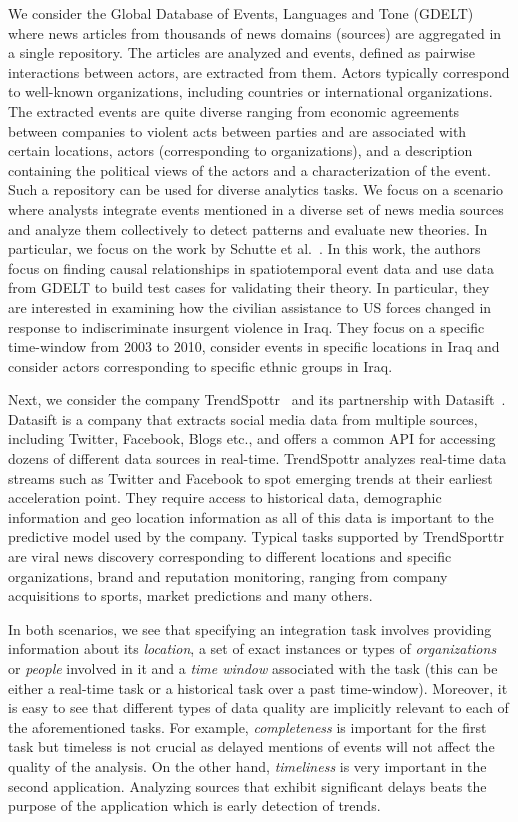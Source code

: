 \documentclass{sig-alternate}
\begin{document}
We consider the Global Database of Events, Languages and Tone (GDELT)~\cite{leetaru:2013} where news articles from thousands of news domains (sources) are aggregated in a single repository. The articles are analyzed and events, defined as pairwise interactions between actors, are extracted from them. Actors typically correspond to well-known organizations, including countries or international organizations. The extracted events are quite diverse ranging from economic agreements between companies to violent acts between parties and are associated with certain locations, actors (corresponding to organizations), and a description containing the political views of the actors and a characterization of the event. Such a repository can be used for diverse analytics tasks. We focus on a scenario where analysts integrate events mentioned in a diverse set of news media sources and analyze them collectively to detect patterns and evaluate new theories. In particular, we focus on the work by Schutte et al.~\cite{schutte:2014}. In this work, the authors focus on finding causal relationships in spatiotemporal event data and use data from GDELT to build test cases for validating their theory. In particular, they are interested in examining how the civilian assistance to US forces changed in response to indiscriminate insurgent violence in Iraq. They focus on a specific time-window from 2003 to 2010, consider events in specific locations in Iraq and consider actors corresponding to specific ethnic groups in Iraq.

Next, we consider the company TrendSpottr~\cite{trendspottr} and its partnership with Datasift~\cite{datasift}. Datasift is a company that extracts social media data from multiple sources, including Twitter, Facebook, Blogs etc., and offers a common API for accessing dozens of different data sources in real-time. TrendSpottr analyzes real-time data streams such as Twitter and Facebook to spot emerging trends at their earliest acceleration point. They require access to historical data, demographic information and geo location information as all of this data is important to the predictive model used by the company. Typical tasks supported by TrendSporttr are viral news discovery corresponding to different locations and specific organizations, brand and reputation monitoring, ranging from company acquisitions to sports,  market predictions and many others. 

In both scenarios, we see that specifying an integration task involves providing information about its {\em location}, a set of exact instances or types of {\em organizations} or {\em people} involved in it and a {\em time window} associated with the task (this can be either a real-time task or a historical task over a past time-window). Moreover, it is easy to see that different types of data quality are implicitly relevant to each of the aforementioned tasks. For example, {\em completeness} is important for the first task but timeless is not crucial as delayed mentions of events will not affect the quality of the analysis. On the other hand, {\em timeliness} is very important in the second application. Analyzing sources that exhibit significant delays beats the purpose of the application which is early detection of trends. 
\end{document}

